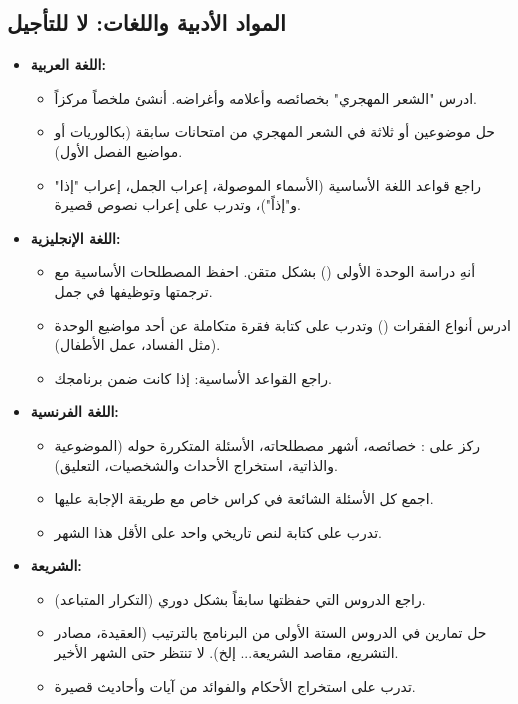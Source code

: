 \documentclass[12pt,a4paper]{book}
\begin{document}
	\subsection{المواد الأدبية واللغات: لا للتأجيل}
	
	\begin{itemize}
		\item \textbf{اللغة العربية:}
		\begin{itemize}
			\item ادرس "الشعر المهجري" بخصائصه وأعلامه وأغراضه. أنشئ ملخصاً مركزاً.
			\item حل موضوعين أو ثلاثة في الشعر المهجري من امتحانات سابقة (بكالوريات أو مواضيع الفصل الأول).
			\item راجع قواعد اللغة الأساسية (الأسماء الموصولة، إعراب الجمل، إعراب "إذا" و"إذاً")، وتدرب على إعراب نصوص قصيرة.
		\end{itemize}
		
		\item \textbf{اللغة الإنجليزية:}
		\begin{itemize}
			\item أنهِ دراسة الوحدة الأولى () بشكل متقن. احفظ المصطلحات الأساسية مع ترجمتها وتوظيفها في جمل.
			\item ادرس أنواع الفقرات () وتدرب على كتابة فقرة متكاملة عن أحد مواضيع الوحدة (مثل الفساد، عمل الأطفال).
			\item راجع القواعد الأساسية:  إذا كانت ضمن برنامجك.
		\end{itemize}
		
		\item \textbf{اللغة الفرنسية:}
		\begin{itemize}
			\item ركز على : خصائصه، أشهر مصطلحاته، الأسئلة المتكررة حوله (الموضوعية والذاتية، استخراج الأحداث والشخصيات، التعليق).
			\item اجمع كل الأسئلة الشائعة في كراس خاص مع طريقة الإجابة عليها.
			\item تدرب على كتابة  لنص تاريخي واحد على الأقل هذا الشهر.
		\end{itemize}
		
		\item \textbf{ الشريعة:}
		\begin{itemize}
			\item راجع الدروس التي حفظتها سابقاً بشكل دوري (التكرار المتباعد).
			\item حل تمارين في الدروس الستة الأولى من البرنامج بالترتيب (العقيدة، مصادر التشريع، مقاصد الشريعة... إلخ). لا تنتظر حتى الشهر الأخير.
			\item تدرب على استخراج الأحكام والفوائد من آيات وأحاديث قصيرة.
		\end{itemize}
		

\end{itemize}
\end{document}
